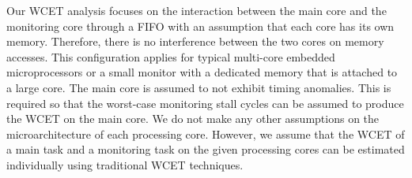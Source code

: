 Our WCET analysis focuses on the interaction between the main core and the
monitoring core through a FIFO with an assumption that each core has its own
memory. Therefore, there is no interference between the two cores on memory
accesses. This configuration applies for typical multi-core embedded
microprocessors or a small monitor with a dedicated memory that is attached to
a large core. The main core is assumed to not exhibit timing anomalies. This is
required so that the worst-case monitoring stall cycles can be assumed to
produce the WCET on the main core.  We do not make any other assumptions on the
microarchitecture of each processing core. However, we assume that the WCET of
a main task and a monitoring task on the given processing cores can be
estimated individually using traditional WCET techniques.

